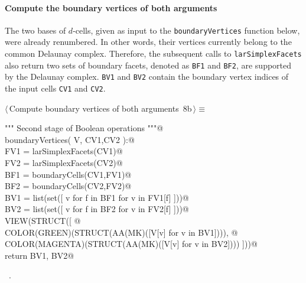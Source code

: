 \documentclass[11pt,oneside]{article}	%
\begin{document}
\paragraph{Compute the boundary vertices of both arguments}
The two bases of $d$-cells, given as input to the \texttt{boundaryVertices} function below, were already renumbered. In other words, their vertices currently belong to the common Delaunay complex. Therefore, the subsequent calls to \texttt{larSimplexFacets} also return two sets of boundary facets, denoted as \texttt{BF1} and \texttt{BF2}, are supported by the Delaunay complex. \texttt{BV1} and \texttt{BV2} contain the boundary vertex indices of the input cells \texttt{CV1} and \texttt{CV2}.

\begin{flushleft} \small \label{scrap15}
\protect{}$\langle\,$Compute boundary vertices of both arguments\nobreak\ {\footnotesize 8b}$\,\rangle\equiv$
\vspace{-1ex}
\begin{list}{}{} \item
\mbox{}\verb@""" Second stage of Boolean operations """@\\
\mbox{}\verb@def boundaryVertices( V, CV1,CV2 ):@\\
\mbox{}\verb@   FV1 = larSimplexFacets(CV1)@\\
\mbox{}\verb@   FV2 = larSimplexFacets(CV2)@\\
\mbox{}\verb@   BF1 = boundaryCells(CV1,FV1)@\\
\mbox{}\verb@   BF2 = boundaryCells(CV2,FV2)@\\
\mbox{}\verb@   BV1 = list(set([ v for f in BF1 for v in FV1[f] ]))@\\
\mbox{}\verb@   BV2 = list(set([ v for f in BF2 for v in FV2[f] ]))@\\
\mbox{}\verb@   VIEW(STRUCT([ @\\
\mbox{}\verb@      COLOR(GREEN)(STRUCT(AA(MK)([V[v] for v in BV1]))), @\\
\mbox{}\verb@      COLOR(MAGENTA)(STRUCT(AA(MK)([V[v] for v in BV2]))) ]))@\\
\mbox{}\verb@   return BV1, BV2@\\
\mbox{}\verb@@{\NWsep}
\end{list}
\vspace{-1ex}
\footnotesize\addtolength{\baselineskip}{-1ex}
\begin{list}{}{\setlength{\itemsep}{-\parsep}\setlength{\itemindent}{-\leftmargin}}
\item \NWtxtMacroRefIn\ .
\end{list}
\end{flushleft}
\end{document}
